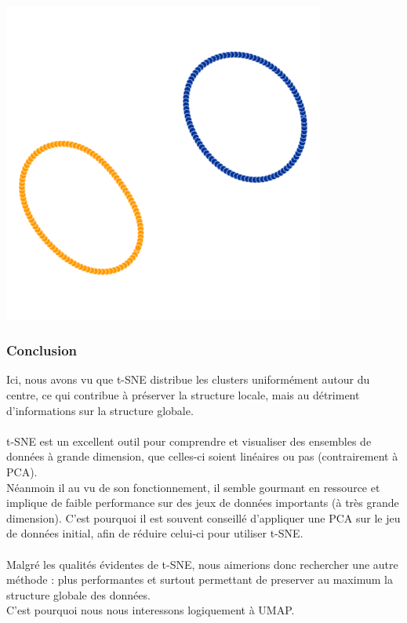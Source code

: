 \\
\includegraphics[width=\linewidth]{./img/reduction_dim/t_sne/exemple_data_2.png}
            


\subsubsection*{Conclusion}
Ici, nous avons vu que t-SNE distribue les clusters uniformément autour du centre, ce qui contribue à préserver la structure locale, mais au détriment d'informations sur la structure globale. 
\\
\\
t-SNE est un excellent outil pour comprendre et visualiser des ensembles de données à grande dimension, que celles-ci soient linéaires ou pas (contrairement à PCA).
\\
Néanmoin il au vu de son fonctionnement, il semble gourmant en ressource et implique de faible performance sur des jeux de données importants (à très grande dimension). C'est pourquoi il est souvent conseillé d'appliquer une PCA sur le jeu de données initial, afin de réduire celui-ci pour utiliser t-SNE.
\\
\\
Malgré les qualités évidentes de t-SNE, nous aimerions donc rechercher une autre méthode : plus performantes et surtout permettant de preserver au maximum la structure globale des données.
\\ 
C'est pourquoi nous nous interessons logiquement à UMAP.


